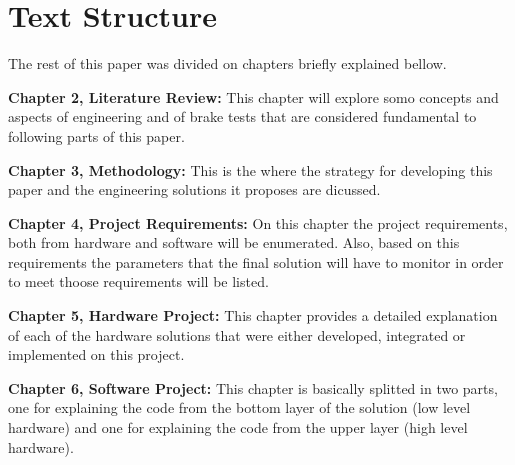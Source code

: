 	\section{Text Structure} 
	
	The rest of this paper was divided on chapters briefly explained bellow.
	
	\textbf{Chapter 2, Literature Review: } This chapter will explore somo concepts and aspects of engineering and of brake tests that are considered fundamental to following parts of this paper.
	\par
	
	\textbf{Chapter 3, Methodology: }
	This is the where the strategy for developing this paper and the engineering solutions it proposes are dicussed.
	\par
	
	\textbf{Chapter 4, Project Requirements: }
	On this chapter the project requirements, both from hardware and software will be enumerated. Also, based on this requirements the parameters that the final solution will have to monitor in order to meet thoose requirements will be listed.
	\par
	
	\textbf{Chapter 5, Hardware Project: }
	This chapter provides a detailed explanation of each of the hardware solutions that were either developed, integrated or implemented on this project.
	\par
	
	\textbf{Chapter 6, Software Project: }
	This chapter is basically splitted in two parts, one for explaining the code from the bottom layer of the solution (low level hardware) and one for explaining the code from the upper layer (high level hardware).
	\par